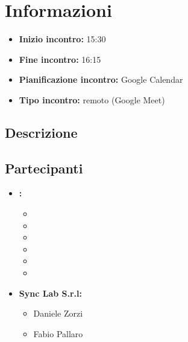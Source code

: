 \section{Informazioni}
\begin{itemize}
	\item \textbf{Inizio incontro:} 15:30
	\item \textbf{Fine incontro:} 16:15
	\item \textbf{Pianificazione incontro:} Google Calendar
	\item \textbf{Tipo incontro:} remoto (Google Meet)
\end{itemize}

\subsection{Descrizione}
\DocDescription

\subsection{Partecipanti}

\begin{itemize}
	\item \textbf{\GroupName:}
	\begin{itemize}
		\item \tommaso
		\item \marco
		\item \raul
		\item \sebastiano
		\item \martina
		\item \riccardo
	\end{itemize}

	\item \textbf{Sync Lab S.r.l:}
	\begin{itemize}
		\item Daniele Zorzi
		\item Fabio Pallaro
	\end{itemize}
\end{itemize}

\clearpage
